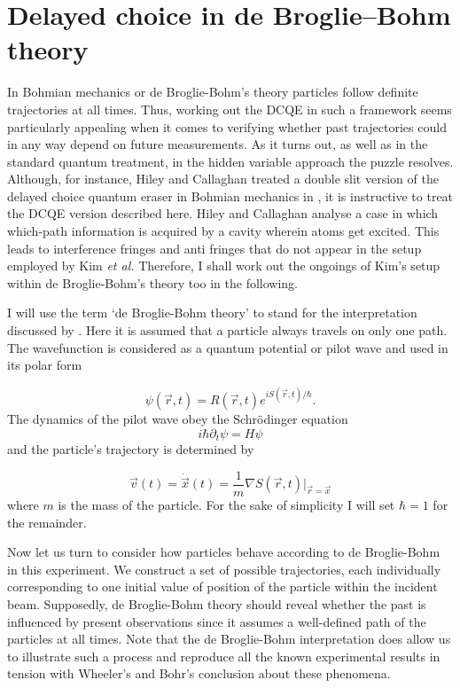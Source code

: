 \documentclass[12pt]{article}
\numberwithin{equation}{section}
\begin{document}
\section{Delayed choice in de Broglie–Bohm theory}
\label{Bohm}

In Bohmian mechanics or de Broglie-Bohm's theory particles follow definite trajectories at all times. Thus, working out the DCQE in such a framework seems particularly appealing when it comes to verifying whether past trajectories could in any way depend on future measurements. As it turns out, as well as in the standard quantum treatment, in the hidden variable approach the puzzle resolves. Although, for instance, Hiley and Callaghan treated a double slit version of the delayed choice quantum eraser in Bohmian mechanics in \cite{hiley2006erased}, it is instructive to treat the DCQE version described here. Hiley and Callaghan analyse a case in which which-path information is acquired by a cavity wherein atoms get excited. This leads to interference fringes and anti fringes that do not appear in the setup employed by Kim \textit{et al.} Therefore, I shall work out the ongoings of Kim's setup within de Broglie-Bohm's theory too in the following. 

I will use the term `de Broglie-Bohm theory' to stand for the interpretation discussed by \cite{bohm2006undivided}. Here it is assumed that a particle always travels on only one path. The wavefunction is considered as a quantum potential or pilot wave and used in its polar form

\begin{equation}
\psi(\vec{r},t)=R(\vec{r},t)e^{iS(\vec{r},t)/\hbar}.
\end{equation} The dynamics of the pilot wave obey the Schrödinger equation
\begin{equation}
i\hbar\partial_t\psi=H\psi
\end{equation} and the particle's trajectory is determined by

\begin{equation}
\vec{v}\left(t\right)=\dot{\vec{x}}(t)=\frac{1}{m}\nabla S(\vec{r},t)|_{\vec{r}=\vec{x}}
\end{equation} where $m$ is the mass of the particle. For the sake of simplicity I will set $\hbar=1$ for the remainder.

Now let us turn to consider how particles behave according to de Broglie-Bohm in this experiment. We construct a set of possible trajectories, each individually corresponding to one initial value of position of the particle within the incident beam. Supposedly, de Broglie-Bohm theory should reveal whether the past is influenced by present observations since it assumes a well-defined path of the particles at all times. Note that the de Broglie-Bohm interpretation does allow us to illustrate such a process and reproduce all the known experimental results in tension with Wheeler's and Bohr's conclusion about these phenomena.
\end{document}
